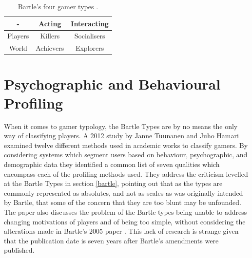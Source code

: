\documentclass[12pt,a4paper,twoside]{report}
\begin{document}
\begin{table}
\begin{center}
\begin{tabular}{|c|c|c|}
	\hline - & Acting & Interacting \\ 
	\hline Players & Killers & Socialisers \\ 
	\hline World & Achievers & Explorers \\ 
	\hline 
\end{tabular}
\end{center}
\caption{Bartle's four gamer types \cite{bartle1996hearts}.}
\label{table:cards}
\end{table}

\section{Psychographic and Behavioural Profiling}
When it comes to gamer typology, the Bartle Types are by no means the only way of classifying players. A 2012 study by Janne Tuunanen and Juho Hamari \cite{tuunanen2012meta} examined twelve different methods used in academic works to classify gamers. By considering systems which segment users based on behaviour, psychographic, and demographic data they identified a common list of seven qualities which encompass each of the profiling methods used. They address the criticism levelled at the Bartle Types in section \ref{bartle}, pointing out that as the types are commonly represented as absolutes, and not as scales as was originally intended by Bartle, that some of the concern that they are too blunt may be unfounded. The paper also discusses the problem of the Bartle types being unable to address changing motivations of players and of being too simple, without considering the alterations made in Bartle's 2005 paper \cite{bartle2005play}. This lack of research is strange given that the publication date is seven years after Bartle's amendments were published.
\end{document}
